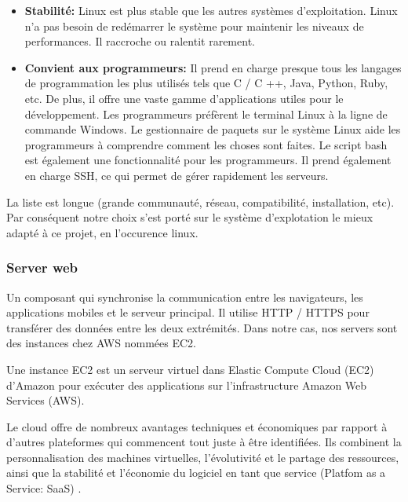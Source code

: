 \begin{itemize}
                \item \textbf{Stabilité: }
                Linux est plus stable que les autres systèmes d'exploitation. Linux n'a pas 
                besoin de redémarrer le système pour maintenir les niveaux de performances. 
                Il raccroche ou ralentit rarement.
                \item \textbf{Convient aux programmeurs: }
                Il prend en charge presque tous les langages de programmation les plus utilisés 
                tels que C / C ++, Java, Python, Ruby, etc. De plus, il offre une vaste gamme 
                d'applications utiles pour le développement.
                Les programmeurs préfèrent le terminal Linux à la ligne de commande Windows. 
                Le gestionnaire de paquets sur le système Linux aide les programmeurs à 
                comprendre comment les choses sont faites. Le script bash est également une 
                fonctionnalité pour les programmeurs. Il prend également en charge SSH, 
                ce qui permet de gérer rapidement les serveurs.
                
        \end{itemize}
        La liste est longue (grande communauté, réseau, compatibilité, installation, etc). Par conséquent
        notre choix s'est porté sur le système d'explotation le mieux adapté à ce projet, en l'occurence linux.

        \subsubsection{Server web}
        Un composant qui synchronise la communication entre les navigateurs, les applications mobiles et 
        le serveur principal. Il utilise HTTP / HTTPS pour transférer des données entre les deux extrémités.
        Dans notre cas,  nos servers sont des instances chez AWS  nommées EC2. 

        Une instance EC2 est un serveur virtuel dans Elastic Compute Cloud (EC2) d'Amazon pour exécuter 
        des applications sur l'infrastructure Amazon Web Services (AWS).
        \par 
Le cloud offre de nombreux avantages techniques et économiques par rapport à  
       d'autres plateformes qui commencent tout juste à être identifiées. Ils combinent la 
        personnalisation des machines virtuelles, l'évolutivité et le partage des ressources,
         ainsi que la stabilité et l'économie du logiciel en tant que service 
         (Platfom as a Service: SaaS) \cite{juve2009scientific}.

